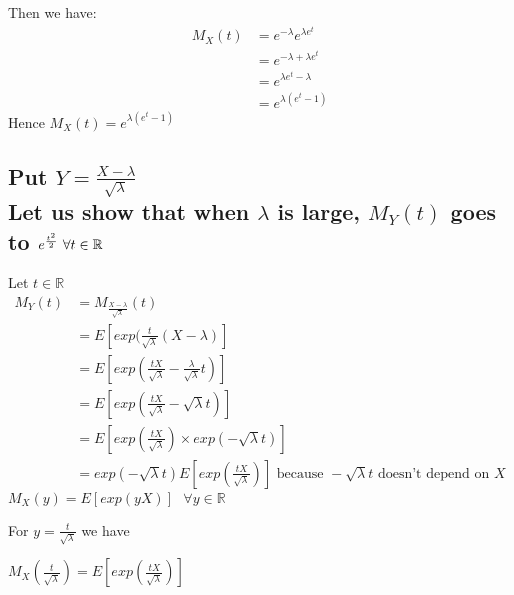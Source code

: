 \documentclass[11pt]{article}
\begin{document}
Then we have:
\begin{align*}
M_X(t)&=e^{-\lambda}e^{\lambda e^t}\\
	&=e^{-\lambda+\lambda e^t}\\
	&=e^{\lambda e^t-\lambda}\\
	&=e^{\lambda( e^t-1)}
\end{align*}
Hence $M_X(t)=e^{\lambda( e^t-1)}$
   
\subsection{Put $Y=\frac{X-\lambda}{\sqrt{\lambda}}$ \\Let us show that when $\lambda$ is large, $M_Y(t)$ goes to $e^{ \frac{t^2}{2} }  \text{ }\forall t \in \mathbb{R\\
}$}

Let $t \in \mathbb{R}$
\begin{align*}
M_Y(t)&=M_{\frac{X-\lambda}{\sqrt{\lambda}}}(t)\\
	&=E[exp(\frac{t}{\sqrt{\lambda}}(X-\lambda)]\\
		&=E[exp(\frac{tX}{\sqrt{\lambda}}-\frac{\lambda}{\sqrt{\lambda}}t)]\\
	&=E[exp(\frac{tX}{\sqrt{\lambda}}-\sqrt{\lambda}t)]\\
	&=E[exp(\frac{tX}{\sqrt{\lambda}})\times exp(-\sqrt{\lambda}t)]\\
	&= exp(-\sqrt{\lambda}t)E[exp(\frac{tX}{\sqrt{\lambda}})] \text{ because } -\sqrt{\lambda}t \text{ doesn't depend on } X 
\end{align*}
$M_X(y)=E[exp(yX)]\textbf{ } \forall y \in \mathbb{R} $

For $y=\frac{t}{\sqrt{\lambda}}$ we have

$M_X(\frac{t}{\sqrt{\lambda}})=E[exp(\frac{tX}{\sqrt{\lambda}})]$
\end{document}
